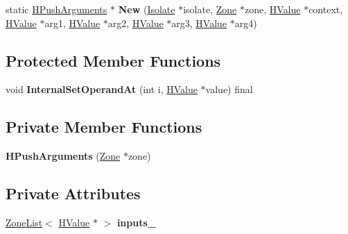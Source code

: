 \begin{DoxyCompactItemize}
\item 
static \hyperlink{classv8_1_1internal_1_1_h_push_arguments}{H\+Push\+Arguments} $\ast$ {\bfseries New} (\hyperlink{classv8_1_1internal_1_1_isolate}{Isolate} $\ast$isolate, \hyperlink{classv8_1_1internal_1_1_zone}{Zone} $\ast$zone, \hyperlink{classv8_1_1internal_1_1_h_value}{H\+Value} $\ast$context, \hyperlink{classv8_1_1internal_1_1_h_value}{H\+Value} $\ast$arg1, \hyperlink{classv8_1_1internal_1_1_h_value}{H\+Value} $\ast$arg2, \hyperlink{classv8_1_1internal_1_1_h_value}{H\+Value} $\ast$arg3, \hyperlink{classv8_1_1internal_1_1_h_value}{H\+Value} $\ast$arg4)\hypertarget{classv8_1_1internal_1_1_h_push_arguments_af324d319c6615f1a962a9e394d06eb06}{}\label{classv8_1_1internal_1_1_h_push_arguments_af324d319c6615f1a962a9e394d06eb06}

\end{DoxyCompactItemize}
\subsection*{Protected Member Functions}
\begin{DoxyCompactItemize}
\item 
void {\bfseries Internal\+Set\+Operand\+At} (int i, \hyperlink{classv8_1_1internal_1_1_h_value}{H\+Value} $\ast$value) final\hypertarget{classv8_1_1internal_1_1_h_push_arguments_a5f4b8c0dafebebfc293e78b24fb14f96}{}\label{classv8_1_1internal_1_1_h_push_arguments_a5f4b8c0dafebebfc293e78b24fb14f96}

\end{DoxyCompactItemize}
\subsection*{Private Member Functions}
\begin{DoxyCompactItemize}
\item 
{\bfseries H\+Push\+Arguments} (\hyperlink{classv8_1_1internal_1_1_zone}{Zone} $\ast$zone)\hypertarget{classv8_1_1internal_1_1_h_push_arguments_ac5d9e6335cc63bbd45cf17e378199762}{}\label{classv8_1_1internal_1_1_h_push_arguments_ac5d9e6335cc63bbd45cf17e378199762}

\end{DoxyCompactItemize}
\subsection*{Private Attributes}
\begin{DoxyCompactItemize}
\item 
\hyperlink{classv8_1_1internal_1_1_zone_list}{Zone\+List}$<$ \hyperlink{classv8_1_1internal_1_1_h_value}{H\+Value} $\ast$ $>$ {\bfseries inputs\+\_\+}\hypertarget{classv8_1_1internal_1_1_h_push_arguments_ad402cab343fe573f25c6caad337a279b}{}\label{classv8_1_1internal_1_1_h_push_arguments_ad402cab343fe573f25c6caad337a279b}

\end{DoxyCompactItemize}
